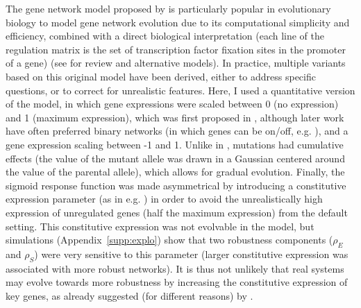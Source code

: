 \documentclass[10pt,a4paper]{article}
\newcommand{\stability}{{\rho_S}}
\newcommand{\earlyenv}{{\rho_E}}
\newcommand{\SupMat}{Appendix~}
\begin{document}
The gene network model proposed by \citet{Wag94} is particularly popular in evolutionary biology to model gene network evolution due to its computational simplicity and efficiency, combined with a direct biological interpretation (each line of the regulation matrix is the set of transcription factor fixation sites in the promoter of a gene) (see \citealp{SH13,FP15} for review and alternative models). In practice, multiple variants based on this original model have been derived, either to address specific questions, or to correct for unrealistic features. Here, I used a quantitative version of the model, in which gene expressions were scaled between 0 (no expression) and 1 (maximum expression), which was first proposed in \citet{Wag94}, although later work have often preferred binary networks (in which genes can be on/off, e.g. \citealp{Wag96,CMW07}), and a gene expression scaling between -1 and 1. Unlike in \citet{Wag96, SB02}, mutations had cumulative effects (the value of the mutant allele was drawn in a Gaussian centered around the value of the parental allele), which allows for gradual evolution. Finally, the sigmoid response function was made asymmetrical by introducing a constitutive expression parameter (as in e.g. \citealp{RL16}) in order to avoid the unrealistically high expression of unregulated genes (half the maximum expression) from the default setting. This constitutive expression was not evolvable in the model, but simulations (\SupMat \ref{supp:explo}) show that two robustness components ($\earlyenv$ and $\stability$) were very sensitive to this parameter (larger constitutive expression was associated with more robust networks). It is thus not unlikely that real systems may evolve towards more robustness by increasing the constitutive expression of key genes, as already suggested (for different reasons) by \citet{DW15}. 
\end{document}
